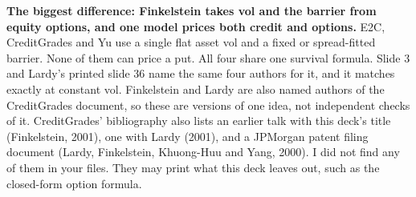 \documentclass[10pt,a4paper]{article}
\begin{document}
\textbf{The biggest difference: Finkelstein takes vol and the barrier from equity options, and one model prices both credit and options.} E2C, CreditGrades and Yu use a single flat asset vol and a fixed or spread-fitted barrier. None of them can price a put. All four share one survival formula. Slide 3 and Lardy's printed slide 36 name the same four authors for it, and it matches  exactly at constant vol. Finkelstein and Lardy are also named authors of the CreditGrades document, so these are versions of one idea, not independent checks of it. CreditGrades' bibliography also lists an earlier talk with this deck's title (Finkelstein, 2001), one with Lardy (2001), and a JPMorgan patent filing document (Lardy, Finkelstein, Khuong-Huu and Yang, 2000). I did not find any of them in your files. They may print what this deck leaves out, such as the closed-form option formula.
\end{document}
